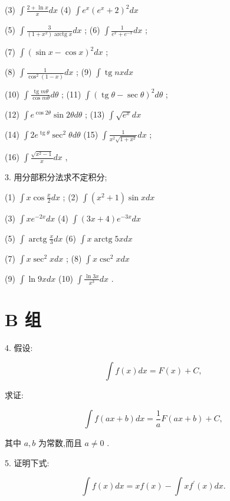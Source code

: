 \documentclass[10pt]{article}
\begin{document}
(3) \(\int \frac{2 + \ln x}{x}{dx}\) (4) \(\int {e}^{x}{\left( {e}^{x} + 2\right) }^{2}{dx}\)

(5) \(\int \frac{3}{\left( {1 + {x}^{2}}\right) \operatorname{arctg}x}{dx}\) ; (6) \(\int \frac{1}{{e}^{x} + {e}^{-x}}{dx}\) ;

(7) \(\int {\left( \sin x - \cos x\right) }^{2}{dx}\) ;

(8) \(\int \frac{1}{{\cos }^{2}\left( {1 - x}\right) }{dx}\) ; (9) \(\int \operatorname{tg}{nxdx}\)

(10) \(\int \frac{\operatorname{tg}{m\theta }}{\cos {m\theta }}{d\theta }\) ; (11) \(\int {\left( \operatorname{tg}\theta - \sec \theta \right) }^{2}{d\theta }\) ;

(12) \(\int {e}^{\cos {2\theta }}\sin {2\theta d\theta }\) ; (13) \(\int \sqrt{{e}^{x}}{dx}\)

(14) \(\int 2{e}^{\operatorname{tg}\theta }{\sec }^{2}{\theta d\theta }\) (15) \(\int \frac{1}{{x}^{2}\sqrt{1 + {x}^{2}}}{dx}\) ;

(16) \(\int \frac{\sqrt{{x}^{2} - 1}}{x}{dx}\) ,

3. 用分部积分法求不定积分;

(1) \(\int x\cos \frac{x}{2}{dx}\) ; (2) \(\int \left( {{x}^{2} + 1}\right) \sin {xdx}\)

(3) \(\int x{e}^{-{2x}}{dx}\) (4) \(\int \left( {{3x} + 4}\right) {e}^{-{3x}}{dx}\)

(5) \(\int \operatorname{arctg}\frac{x}{3}{dx}\) (6) \(\int x\operatorname{arctg}{5xdx}\)

(7) \(\int x{\sec }^{2}{xdx}\) ; (8) \(\int x{\csc }^{2}{xdx}\)

(9) \(\int \ln {9xdx}\) (10) \(\int \frac{\ln {3x}}{{x}^{3}}{dx}\) .

\section*{B 组}

4. 假设:

\[
\int f\left( x\right) {dx} = F\left( x\right) + C,
\]

求证:

\[
\int f\left( {{ax} + b}\right) {dx} = \frac{1}{a}F\left( {{ax} + b}\right) + C,
\]

其中 \(a,b\) 为常数,而且 \(a \neq 0\) .

5. 证明下式:

\[
\int f\left( x\right) {dx} = {xf}\left( x\right) - \int x{f}^{\prime }\left( x\right) {dx}.
\]
\end{document}
